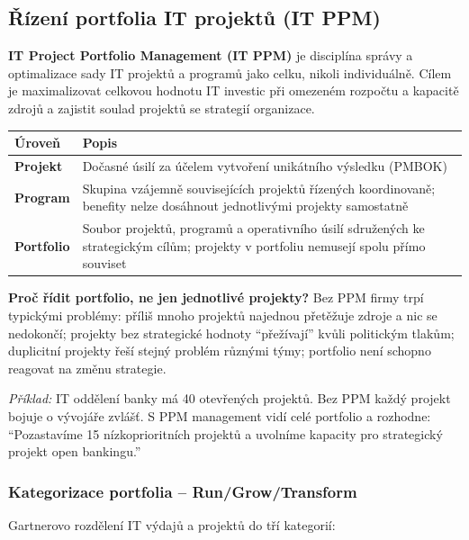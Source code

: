 \subsection{Řízení portfolia IT projektů (IT PPM)}

\textbf{IT Project Portfolio Management (IT PPM)} je disciplína správy a optimalizace sady IT projektů
a programů jako celku, nikoli individuálně.
Cílem je maximalizovat celkovou hodnotu IT investic při omezeném rozpočtu a kapacitě zdrojů
a zajistit soulad projektů se strategií organizace.

\begin{center}
\begin{tabular}{p{2.5cm}p{10cm}}
\toprule
\textbf{Úroveň} & \textbf{Popis} \\
\midrule
\textbf{Projekt} & Dočasné úsilí za účelem vytvoření unikátního výsledku (PMBOK) \\
\textbf{Program} & Skupina vzájemně souvisejících projektů řízených koordinovaně;
  benefity nelze dosáhnout jednotlivými projekty samostatně \\
\textbf{Portfolio} & Soubor projektů, programů a operativního úsilí sdružených ke strategickým cílům;
  projekty v portfoliu nemusejí spolu přímo souviset \\
\bottomrule
\end{tabular}
\end{center}

\textbf{Proč řídit portfolio, ne jen jednotlivé projekty?}
Bez PPM firmy trpí typickými problémy: příliš mnoho projektů najednou přetěžuje zdroje a nic se nedokončí;
projekty bez strategické hodnoty ``přežívají'' kvůli politickým tlakům; duplicitní projekty řeší stejný problém
různými týmy; portfolio není schopno reagovat na změnu strategie.

\textit{Příklad:} IT oddělení banky má 40 otevřených projektů. Bez PPM každý projekt bojuje o vývojáře zvlášť.
S PPM management vidí celé portfolio a rozhodne: ``Pozastavíme 15 nízkoprioritních projektů
a uvolníme kapacity pro strategický projekt open bankingu.''

\subsubsection{Kategorizace portfolia -- Run/Grow/Transform}

Gartnerovo rozdělení IT výdajů a projektů do tří kategorií:

